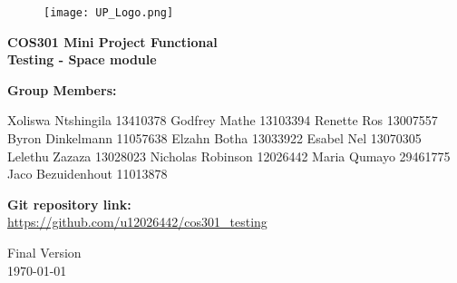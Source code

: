 \begin{titlepage}
	\begin{center}
		
		\begin{figure}[t]
			\centering
			\texttt{[image: UP\_Logo.png]}
		\end{figure}		
		
		\textbf{\LARGE COS301 Mini Project Functional \\Testing - Space module\\}
		
		\vspace{1 cm}
		
		\LARGE{\textbf{Group Members: }}
		

		\begin{flushright} \large
			Xoliswa Ntshingila 13410378\newline
			Godfrey Mathe 13103394 \newline
			Renette Ros 13007557\newline
			Byron Dinkelmann 11057638\newline
			Elzahn Botha 13033922\newline
			Esabel Nel 13070305\newline
			Lelethu Zazaza 13028023\newline
			Nicholas Robinson 12026442\newline
			Maria Qumayo 29461775\newline
			Jaco Bezuidenhout 11013878\newline
		\end{flushright}
		
	
		
		\textbf{Git repository link:\\}
		 \url{ https://github.com/u12026442/cos301_testing}
		
		\vfill
		
		{\LARGE Final Version}
		\\
		{\large \today}		
		
		
	\end{center}
\end{titlepage}
